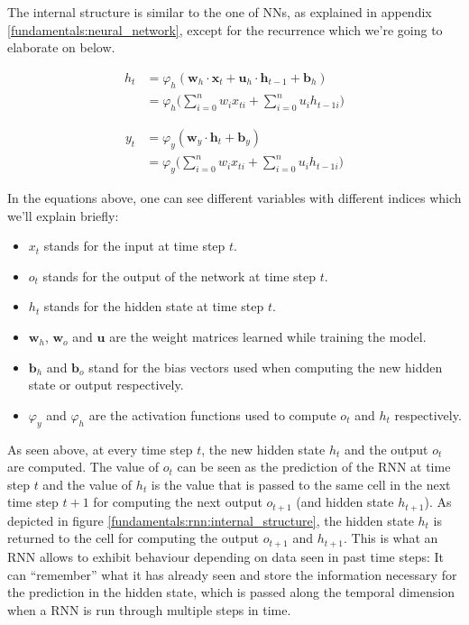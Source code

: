 The internal structure is similar to the one of NNs, as explained in appendix \ref{fundamentals:neural_network}, except for the recurrence which we're going to elaborate on below.

\begin{equation}
\begin{split}
h_t & = \varphi_h(\mathbf{w}_h \cdot \mathbf{x}_t + \mathbf{u}_h \cdot \mathbf{h}_{t-1} + \mathbf{b}_h) \\
    & = \varphi_h\bigg(\sum_{i=0}^{n} w_i x_{ti} + \sum_{i=0}^{n} u_i h_{t-1i}\bigg)
\end{split}
\label{fundamentals:rnn:forward_equation:hidden}
\end{equation}

\begin{equation}
\begin{split}
y_t & = \varphi_y(\mathbf{w}_y \cdot \mathbf{h}_t + \mathbf{b}_y) \\
    & = \varphi_y\bigg(\sum_{i=0}^{n} w_i x_{ti} + \sum_{i=0}^{n} u_i h_{t-1i}\bigg)
\end{split}
\label{fundamentals:rnn:forward_equation:output}
\end{equation}

In the equations above, one can see different variables with different indices which we'll explain briefly:

\begin{itemize}[noitemsep]
	\item $x_t$ stands for the input at time step $t$.
	\item $o_t$ stands for the output of the network at time step $t$.
	\item $h_t$ stands for the hidden state at time step $t$.
	\item $\mathbf{w}_h$, $\mathbf{w}_o$ and $\mathbf{u}$ are the weight matrices learned while training the model.
	\item $\mathbf{b}_h$ and $\mathbf{b}_o$ stand for the bias vectors used when computing the new hidden state or output respectively.
	\item $\varphi_y$ and $\varphi_h$ are the activation functions used to compute $o_t$ and $h_t$ respectively.
\end{itemize}

As seen above, at every time step $t$, the new hidden state $h_t$ and the output $o_t$ are computed. The value of $o_t$ can be seen as the prediction of the RNN at time step $t$ and the value of $h_t$ is the value that is passed to the same cell in the next time step $t+1$ for computing the next output $o_{t+1}$ (and hidden state $h_{t+1}$). As depicted in figure \ref{fundamentals:rnn:internal_structure}, the hidden state $h_t$ is returned to the cell for computing the output $o_{t+1}$ and $h_{t+1}$. This is what an RNN allows to exhibit behaviour depending on data seen in past time steps: It can ``remember'' what it has already seen and store the information necessary for the prediction in the hidden state, which is passed along the temporal dimension when a RNN is run through multiple steps in time.

